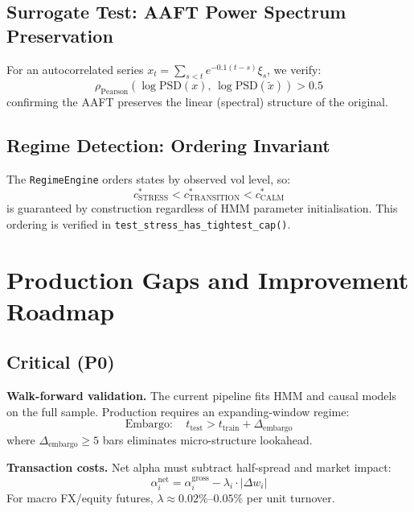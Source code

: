 \documentclass[12pt,a4paper]{article}
\begin{document}
\subsection{Surrogate Test: AAFT Power Spectrum Preservation}

For an autocorrelated series $x_t = \sum_{s<t} e^{-0.1(t-s)} \xi_s$, we verify:
\begin{equation}
    \rho_\text{Pearson}\!\left(\log\mathrm{PSD}(x),\, \log\mathrm{PSD}(\tilde{x})\right) > 0.5
\end{equation}
confirming the AAFT preserves the linear (spectral) structure of the original.

\subsection{Regime Detection: Ordering Invariant}

The \texttt{RegimeEngine} orders states by observed vol level, so:
\begin{equation}
    c^*_{\text{STRESS}} < c^*_{\text{TRANSITION}} < c^*_{\text{CALM}}
\end{equation}
is guaranteed by construction regardless of HMM parameter initialisation.
This ordering is verified in \texttt{test\_stress\_has\_tightest\_cap()}.

\section{Production Gaps and Improvement Roadmap}

\subsection{Critical (P0)}

\textbf{Walk-forward validation.} The current pipeline fits HMM and causal
models on the full sample. Production requires an expanding-window regime:
\begin{equation}
    \text{Embargo}: \quad t_{\text{test}} > t_{\text{train}} + \Delta_{\text{embargo}}
\end{equation}
where $\Delta_{\text{embargo}} \geq 5$ bars eliminates micro-structure lookahead.

\textbf{Transaction costs.} Net alpha must subtract half-spread and market impact:
\begin{equation}
    \alpha_i^{\text{net}} = \alpha_i^{\text{gross}} - \lambda_i \cdot |\Delta w_i|
\end{equation}
For macro FX/equity futures, $\lambda \approx 0.02\%$--$0.05\%$ per unit turnover.
\end{document}
